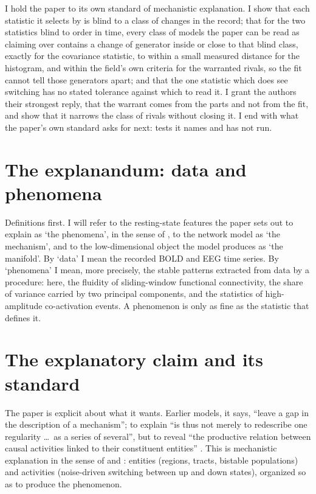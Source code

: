 \documentclass[11pt]{article}
\begin{document}
I hold the paper to its own standard of mechanistic explanation. I show that each statistic it selects by is blind to a class of changes in the record; that for the two statistics blind to order in time, every class of models the paper can be read as claiming over contains a change of generator inside or close to that blind class, exactly for the covariance statistic, to within a small measured distance for the histogram, and within the field's own criteria for the warranted rivals, so the fit cannot tell those generators apart; and that the one statistic which does see switching has no stated tolerance against which to read it. I grant the authors their strongest reply, that the warrant comes from the parts and not from the fit, and show that it narrows the class of rivals without closing it. I end with what the paper's own standard asks for next: tests it names and has not run.

\section{The explanandum: data and phenomena}
Definitions first. I will refer to the resting-state features the paper sets out to explain as `the phenomena', in the sense of \textcite{bogen1988}, to the network model as `the mechanism', and to the low-dimensional object the model produces as `the manifold'. By `data' I mean the recorded BOLD and EEG time series. By `phenomena' I mean, more precisely, the stable patterns extracted from data by a procedure: here, the fluidity of sliding-window functional connectivity, the share of variance carried by two principal components, and the statistics of high-amplitude co-activation events. A phenomenon is only as fine as the statistic that defines it.


\section{The explanatory claim and its standard}
The paper is explicit about what it wants. Earlier models, it says, ``leave a gap in the description of a mechanism''; to explain ``is thus not merely to redescribe one regularity \ldots\ as a series of several'', but to reveal ``the productive relation between causal activities linked to their constituent entities'' \parencite[Introduction]{fousek2024}. This is mechanistic explanation in the sense of \textcite{mdc2000} and \textcite{craver2007}: entities (regions, tracts, bistable populations) and activities (noise-driven switching between up and down states), organized so as to produce the phenomenon.
\end{document}

